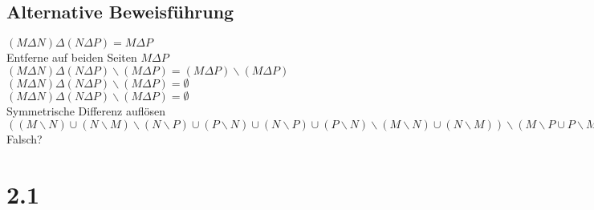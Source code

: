 \subsection{Alternative Beweisführung}
\((M \Delta N) \Delta (N\Delta P) = M \Delta P\) \\
Entferne auf beiden Seiten \( M \Delta P\) \\
\( ( M \Delta N ) \Delta ( N \Delta P ) \backslash ( M \Delta P ) = ( M \Delta P ) \backslash ( M \Delta P ) \) \\
\( ( M \Delta N ) \Delta ( N \Delta P ) \backslash ( M \Delta P ) = \emptyset \) \\
\( ( M \Delta N ) \Delta ( N \Delta P ) \backslash ( M \Delta P ) = \emptyset \) \\
Symmetrische Differenz auflösen
\( ((M \backslash N ) \cup (N \backslash M) \backslash ( N \backslash P ) \cup ( P \backslash N ) 
\cup
( N \backslash P ) \cup ( P \backslash N) \backslash ( M \backslash N ) \cup ( N \backslash M )) 
\backslash ( M \backslash P \cup P \backslash M)
= \emptyset \)
Falsch?
\section{2.1}